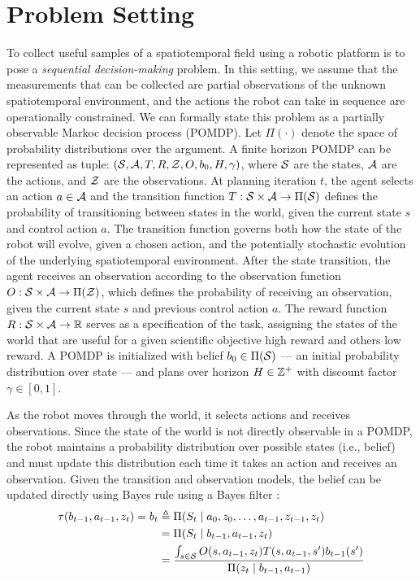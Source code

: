 \chapter{Problem Setting}

To collect useful samples of a spatiotemporal field using a robotic platform is to pose a \emph{sequential decision-making} problem. In this setting, we assume that the measurements that can be collected are partial observations of the unknown spatiotemporal environment, and the actions the robot can take in sequence are operationally constrained. We can formally state this problem as a partially observable Markoc decision process (POMDP). Let $\Pi(\cdot)$ denote the space of probability distributions over the argument. A finite horizon POMDP can be represented as tuple: $(\mathcal{S}, \mathcal{A}, T, R, \mathcal{Z}, O, b_0, H, \gamma)$, where $\mathcal{S}$ are the states, $\mathcal{A}$ are the actions, and $\mathcal{Z}$ are the observations. At planning iteration $t$, the agent selects an action $a \in \mathcal{A}$ and the transition function $T: \mathcal{S} \times \mathcal{A} \to \Pi(\mathcal{S})$ defines the probability of transitioning between states in the world, given the current state $s$ and control action $a$. The transition function governs both how the state of the robot will evolve, given a chosen action, and the potentially stochastic evolution of the underlying spatiotemporal environment. After the state transition, the agent receives an observation according to the observation function $O: \mathcal{S} \times \mathcal{A} \to \Pi(\mathcal{Z})$, which defines the probability of receiving an observation, given the current state $s$ and previous control action $a$. The reward function $R: \mathcal{S} \times \mathcal{A} \to \mathbb{R}$ serves as a specification of the task, assigning the states of the world that are useful for a given scientific objective high reward and others low reward. A POMDP is initialized with belief $b_0 \in \Pi(\mathcal{S})$ --- an initial probability distribution over state --- and plans over horizon $H \in \mathbb{Z}^+$ with discount factor $\gamma \in [0, 1]$.

As the robot moves through the world, it selects actions and receives observations. Since the state of the world is not directly observable in a POMDP, the robot maintains a probability distribution over possible states (i.e., belief) and must update this distribution each time it takes an action and receives an observation. Given the transition and observation models, the belief can be updated directly using Bayes rule using a Bayes filter \cite{sarkka2013bayesian}:
\begin{align}
    \tau(b_{t-1}, a_{t-1}, z_t) = b_t
        &\triangleq \Pi(S_t \mid a_0, z_0, \dots, a_{t-1}, z_{t-1}, z_t) \\
        &= \Pi(S_t \mid b_{t-1}, a_{t-1}, z_t) \\
        &= \frac{\int_{s \in \mathcal{S}} O(s, a_{t-1}, z_t) T(s, a_{t-1}, s')b_{t-1}(s')}{\Pi(z_t \mid b_{t-1}, a_{t-1})}
    \label{eq:bayes_tau}
\end{align}

